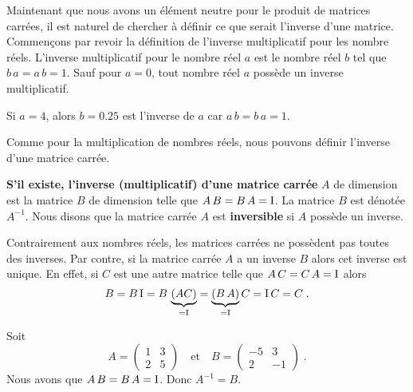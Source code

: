 {Maintenant que nous avons un élément neutre pour le produit de matrices
carrées, il est naturel de chercher à définir ce que serait l'inverse
d'une matrice. Commençons par revoir la définition de l'inverse
multiplicatif pour les nombre réels.  L'inverse multiplicatif pour le
nombre réel $a$ est le nombre réel $b$ tel que $b\,a=a\,b =1$.  Sauf
pour $a=0$, tout nombre réel $a$ possède un inverse multiplicatif.

\begin{egg}
Si $a = 4$, alors $b = 0.25$ est l'inverse de $a$ car $a\,b= b\,a = 1$.
\end{egg}

Comme pour la multiplication de nombres réels, nous pouvons définir
l'inverse d'une matrice carrée.

\begin{focus}{\dfn}
{\bfseries S'il existe, l'inverse (multiplicatif) d'une matrice carrée}
 $A$ de
dimension \nn est la matrice $B$ de dimension \nn telle que
$A\,B = B\, A = \operatorname{I}$.  La matrice $B$ est dénotée $A^{-1}$.  Nous disons
que la matrice carrée $A$ est {\bfseries inversible} si $A$ possède un
inverse.
\end{focus}

Contrairement aux nombres réels, les matrices carrées ne possèdent pas
toutes des inverses.  Par contre, si la matrice carrée $A$ a un
inverse $B$ alors cet inverse est unique.  En effet, si $C$ est une
autre matrice telle que $A\, C = C\, A = \operatorname{I}$ alors
\[
B = B \operatorname{I} = B\, \underbrace{(A C)}_{=\operatorname{I}}
= \underbrace{(B\, A)}_{=\operatorname{I}} C = \operatorname{I} C = C \; .
\]

\begin{egg}
Soit
\[
A = \begin{pmatrix} 1 & 3 \\ 2 & 5 \end{pmatrix}
\quad \text{et} \quad
B = \begin{pmatrix} -5 & 3 \\ 2 & -1 \end{pmatrix} \; .
\]
Nous avons que $A\,B = B\, A = \operatorname{I}$.  Donc $A^{-1} = B$.
\end{egg}

}

